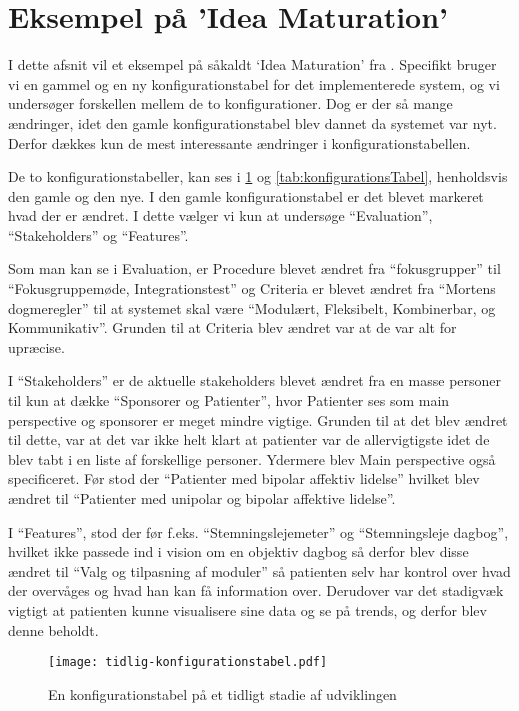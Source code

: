 \section{Eksempel på 'Idea Maturation'}
I dette afsnit vil et eksempel på såkaldt `Idea Maturation' fra \citet[Kapitel 23]{art:essence}.
Specifikt bruger vi en gammel og en ny konfigurationstabel for det implementerede system, og vi undersøger forskellen mellem de to konfigurationer.
Dog er der så mange ændringer, idet den gamle konfigurationstabel blev dannet da systemet var nyt. 
Derfor dækkes kun de mest interessante ændringer i konfigurationstabellen.

De to konfigurationstabeller, kan ses i \cref{tab:tidligKonfigurationsTabel} og \cref{tab:konfigurationsTabel}, henholdsvis den gamle og den nye. 
I den gamle konfigurationstabel er det blevet markeret hvad der er ændret.
I dette vælger vi kun at undersøge ``Evaluation'', ``Stakeholders'' og ``Features''. 

Som man kan se i Evaluation, er Procedure blevet ændret fra ``fokusgrupper'' til ``Fokusgruppemøde, Integrationstest'' og Criteria er blevet ændret fra ``Mortens dogmeregler'' til at systemet skal være ``Modulært, Fleksibelt, Kombinerbar, og Kommunikativ''. Grunden til at Criteria blev ændret var at de var alt for upræcise.

I ``Stakeholders'' er de aktuelle stakeholders blevet ændret fra en masse personer til kun at dække ``Sponsorer og Patienter'', hvor Patienter ses som main perspective og sponsorer er meget mindre vigtige. 
Grunden til at det blev ændret til dette, var at det var ikke helt klart at patienter var de allervigtigste idet de blev tabt i en liste af forskellige personer.
Ydermere blev Main perspective også specificeret.
Før stod der ``Patienter med bipolar affektiv lidelse'' hvilket blev ændret til ``Patienter med unipolar og bipolar affektive lidelse''. 

I ``Features'', stod der før f.eks. ``Stemningslejemeter'' og ``Stemningsleje dagbog'', hvilket ikke passede ind i vision om en objektiv dagbog så derfor blev disse ændret til ``Valg og tilpasning af moduler'' så patienten selv har kontrol over hvad der overvåges og hvad han kan få information over. Derudover var det stadigvæk vigtigt at patienten kunne visualisere sine data og se på trends, og derfor blev denne beholdt. 

\begin{figure}
	\texttt{[image: tidlig-konfigurationstabel.pdf]}
	\caption{En konfigurationstabel på et tidligt stadie af udviklingen}
	\label{tab:tidligKonfigurationsTabel}
\end{figure}
